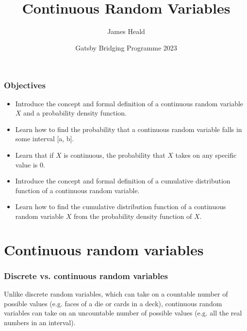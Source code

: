 \documentclass[10pt]{beamer}
\title[Continuous Random Variables ]
{Continuous Random Variables\newline }
\subtitle{}
\author[James Heald] %
{James Heald\inst{1}}
\institute[UCL] %
{
  \inst{1}%
  Gatsby Computational Neuroscience Unit\\
  University College London
}
\date[Gatsby Bridging Programme  2023] %
{Gatsby Bridging Programme 2023}
\begin{document}
\frame{\titlepage}



\begin{frame}
\frametitle{Objectives}
\begin{itemize}
    \item Introduce the concept and formal definition of a continuous random variable $X$ and a probability density function.
        \item Learn how to find the probability that a continuous random variable falls in some interval [a, b].
    \item Learn that if $X$ is continuous, the probability that $X$ takes on any specific value is 0.
    \item Introduce the concept and formal definition of a cumulative distribution function of a continuous random variable.
    \item Learn how to find the cumulative distribution function of a continuous random variable $X$ from the probability density function of $X$.
\end{itemize}
\end{frame}

\section{Continuous random variables}
\begin{frame}
\frametitle{Discrete vs. continuous random variables}

Unlike discrete random variables, which can take on a countable number of possible values (e.g. faces of a die or cards in a deck), continuous random variables can take on an uncountable number of possible values (e.g. all the real numbers in an interval).

\


\end{frame}
\end{document}
